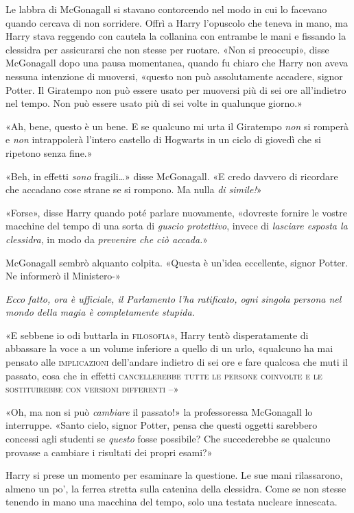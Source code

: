 Le labbra di McGonagall si stavano contorcendo nel modo in cui lo facevano quando cercava di non sorridere. Offrì a Harry l’opuscolo che teneva in mano, ma Harry stava reggendo con cautela la collanina con entrambe le mani e fissando la clessidra per assicurarsi che non stesse per ruotare. «Non si preoccupi», disse McGonagall dopo una pausa momentanea, quando fu chiaro che Harry non aveva nessuna intenzione di muoversi, «questo non può assolutamente accadere, signor Potter. Il Giratempo non può essere usato per muoversi più di sei ore all’indietro nel tempo. Non può essere usato più di sei volte in qualunque giorno.»

«Ah, bene, questo è un bene. E se qualcuno mi urta il Giratempo \textit{non} si romperà e \textit{non} intrappolerà l’intero castello di Hogwarts in un ciclo di giovedì che si ripetono senza fine.»

«Beh, in effetti \textit{sono} fragili…» disse McGonagall. «E credo davvero di ricordare che accadano cose strane se si rompono. Ma nulla \textit{di simile!}»

«Forse», disse Harry quando poté parlare nuovamente, «dovreste fornire le vostre macchine del tempo di una sorta di \textit{guscio protettivo}, invece di \textit{lasciare esposta la clessidra}, in modo da \textit{prevenire che ciò accada.}»

McGonagall sembrò alquanto colpita. «Questa è un’idea eccellente, signor Potter. Ne informerò il Ministero-»

\textit{Ecco fatto, ora è ufficiale, il Parlamento l’ha ratificato, ogni singola persona nel mondo della magia è completamente stupida.}

«E sebbene io odi buttarla in \textsc{filosofia}», Harry tentò disperatamente di abbassare la voce a un volume inferiore a quello di un urlo, «qualcuno ha mai pensato alle \textsc{implicazioni} dell’andare indietro di sei ore e fare qualcosa che muti il passato, cosa che in effetti \textsc{cancellerebbe tutte le persone coinvolte e le sostituirebbe con versioni differenti –}»

«Oh, ma non si può \textit{cambiare} il passato!» la professoressa McGonagall lo interruppe. «Santo cielo, signor Potter, pensa che questi oggetti sarebbero concessi agli studenti se \textit{questo} fosse possibile? Che succederebbe se qualcuno provasse a cambiare i risultati dei propri esami?»

Harry si prese un momento per esaminare la questione. Le sue mani rilassarono, almeno un po’, la ferrea stretta sulla catenina della clessidra. Come se non stesse tenendo in mano una macchina del tempo, solo una testata nucleare innescata.

